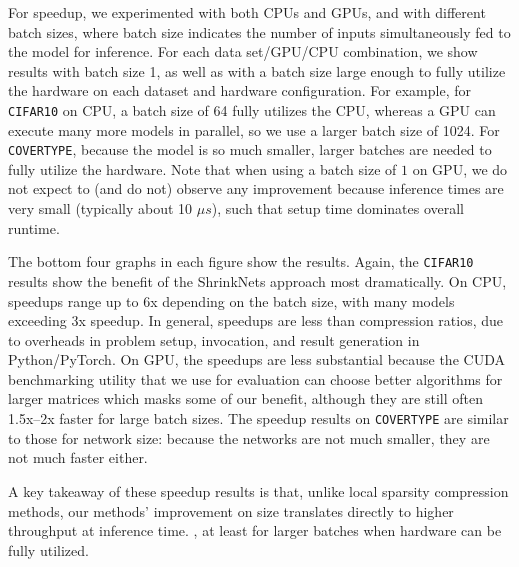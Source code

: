 For speedup, we experimented with both CPUs and GPUs, and with different batch sizes, where batch size indicates the number of inputs simultaneously fed to the model for inference.
For each data set/GPU/CPU combination, we show results with batch size 1, as well as with a batch size large enough to fully utilize the hardware on each dataset and hardware configuration.  For example, for {\tt CIFAR10} on CPU, a batch size of 64 fully utilizes the CPU, whereas a GPU can execute many more models in parallel, so we use a larger batch size of 1024.  For {\tt COVERTYPE}, because the model is so much smaller, larger batches are needed to fully utilize the hardware.
Note that when using a batch size of $1$ on GPU, we do not expect to (and do not) observe any improvement because inference times are very small (typically about 10 $\mu s$), such that setup time dominates overall runtime.  

 The bottom four graphs in each figure 
show the results.  Again, the {\tt CIFAR10} results show the benefit of the ShrinkNets approach
most dramatically.  On CPU, speedups range up to 6x depending on the batch size, with many models exceeding 3x speedup. In general, speedups are less than compression ratios, due to overheads in problem setup, invocation, and result generation  in Python/PyTorch.
  On GPU, the speedups are less substantial because the CUDA benchmarking utility that we use for evaluation can choose better algorithms for larger matrices which masks some of our benefit, although they are still often 1.5x--2x faster for large batch sizes.
The speedup results on {\tt COVERTYPE} are similar to those for network size:  because the networks are not much smaller, they are not much faster either.

A key takeaway of these speedup results is that, unlike local sparsity compression methods, our methods' improvement on size translates directly to higher throughput at inference time.  , at least for larger batches when hardware can be fully utilized.





